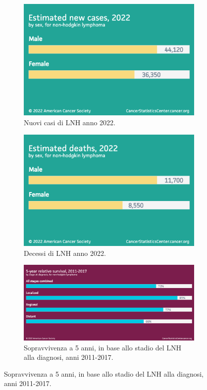 \begin{figure}[H]
    \centering
    \begin{subfigure}[b]{0.4\textwidth}
            \includegraphics[width=\linewidth]{img/Estimatednewcases2022.png}
            \caption{Nuovi casi di LNH anno 2022.}
            
    \end{subfigure}
    \begin{subfigure}[b]{0.4\textwidth}
            \includegraphics[width=\linewidth]{img/Estimateddeaths2022.png}
            \caption{Decessi di LNH anno 2022.}
            
    \end{subfigure}

\begin{subfigure}[b]{0.7\textwidth}
    \includegraphics[width=\linewidth]{img/5-yearrelativesurvival2011-2017.png}
    \caption{Sopravvivenza a 5 anni, in base allo stadio del LNH alla diagnosi, anni 2011-2017.}
    

\end{subfigure}
\end{figure}
